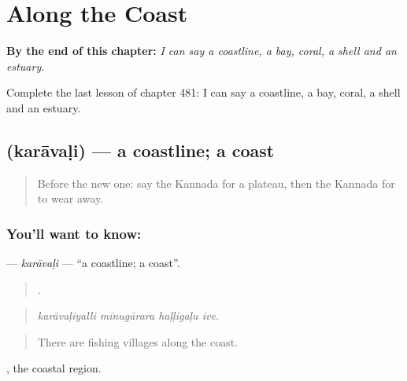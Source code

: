 
\chapter{Along the Coast}
\label{ch:ka-along-the-coast}

\begin{chapteropening}
\textbf{By the end of this chapter:} \emph{I can say a coastline, a bay, coral, a shell and an estuary.}

Complete the last lesson of chapter 481: I can say a coastline, a bay, coral, a shell and an estuary.
\end{chapteropening}

\section[\texorpdfstring{\kn{ಕರಾವಳಿ} (karāvaḷi)}{ಕರಾವಳಿ (karāvaḷi)}]{ (karāvaḷi) — a coastline; a coast}

\label{lesson:KA-C481-karavali}



\begin{quote}
Before the new one: say the Kannada for a plateau, then the Kannada for to wear away.
\end{quote}

\subsection*{You'll want to know: }
\textbf{} — \emph{karāvaḷi} — \textquotedblleft{}a coastline; a coast\textquotedblright{}.

\begin{quote}
   .
\end{quote}

\begin{quote}
\emph{karāvaḷiyalli mīnugārara haḷḷigaḷu ive.}
\end{quote}

\begin{quote}
There are fishing villages along the coast.
\end{quote}

 , the coastal region.

